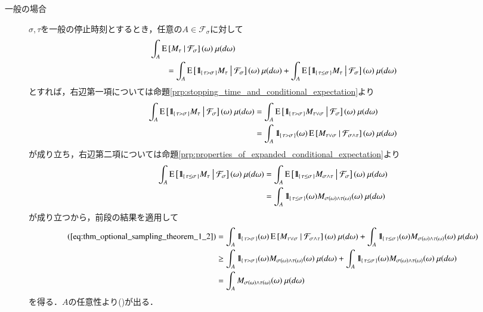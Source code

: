 \begin{prf}
\begin{description}
			\item[一般の場合]
				$\sigma,\tau$を一般の停止時刻とするとき，任意の$A \in \mathcal{F}_\sigma$に対して
				\begin{align}
					&\int_A \operatorname{E} \left[ M_\tau \ \middle|\ \mathcal{F}_\sigma \right](\omega)\ \mu(d\omega) \\
					&\qquad = \int_A \operatorname{E} \left[ \mbox{1}\hspace{-0.25em}\mbox{l}_{\{\, \tau > \sigma \, \}} M_\tau \ \middle|\ \mathcal{F}_\sigma \right](\omega)\ \mu(d\omega)
						+ \int_A \operatorname{E} \left[ \mbox{1}\hspace{-0.25em}\mbox{l}_{\{\, \tau \leq \sigma \, \}} M_\tau \ \middle|\ \mathcal{F}_\sigma \right](\omega)\ \mu(d\omega)
					\label{eq:thm_optional_sampling_theorem_1_2}
				\end{align}
				とすれば，右辺第一項については命題\ref{prp:stopping_time_and_conditional_expectation}より
				\begin{align}
					\int_A \operatorname{E} \left[ \mbox{1}\hspace{-0.25em}\mbox{l}_{\{\, \tau > \sigma \, \}} M_\tau \ \middle|\ \mathcal{F}_\sigma \right](\omega)\ \mu(d\omega)
					&= \int_A \operatorname{E} \left[ \mbox{1}\hspace{-0.25em}\mbox{l}_{\{\, \tau > \sigma \, \}} M_{\tau \vee \sigma} \ \middle|\ \mathcal{F}_\sigma \right](\omega)\ \mu(d\omega) \\
					&= \int_A \mbox{1}\hspace{-0.25em}\mbox{l}_{\{\, \tau > \sigma \, \}}(\omega) \operatorname{E} \left[ M_{\tau \vee \sigma} \ \middle|\ \mathcal{F}_{\sigma \wedge \tau} \right](\omega)\ \mu(d\omega)
				\end{align}
				が成り立ち，右辺第二項については命題\ref{prp:properties_of_expanded_conditional_expectation}より
				\begin{align}
					\int_A \operatorname{E} \left[ \mbox{1}\hspace{-0.25em}\mbox{l}_{\{\, \tau \leq \sigma \, \}} M_\tau \ \middle|\ \mathcal{F}_\sigma \right](\omega)\ \mu(d\omega)
					&= \int_A \operatorname{E} \left[ \mbox{1}\hspace{-0.25em}\mbox{l}_{\{\, \tau \leq \sigma \, \}} M_{\sigma \wedge \tau} \ \middle|\ \mathcal{F}_\sigma \right](\omega)\ \mu(d\omega) \\
					&= \int_A \mbox{1}\hspace{-0.25em}\mbox{l}_{\{\, \tau \leq \sigma \, \}}(\omega) M_{\sigma(\omega) \wedge \tau(\omega)}(\omega)\ \mu(d\omega)
				\end{align}
				が成り立つから，前段の結果を適用して
				\begin{align}
					\mbox{(\refeq{eq:thm_optional_sampling_theorem_1_2})}
					&= \int_A \defunc_{\{\, \tau > \sigma \, \}}(\omega) \cexp{M_{\tau \vee \sigma}}{\mathcal{F}_{\sigma \wedge \tau}}(\omega)\ \mu(d\omega)
						+ \int_A \defunc_{\{\, \tau \leq \sigma \, \}}(\omega) M_{\sigma(\omega) \wedge \tau(\omega)}(\omega)\ \mu(d\omega) \\
					&\geq \int_A \defunc_{\{\, \tau > \sigma \, \}}(\omega) M_{\sigma(\omega) \wedge \tau(\omega)}(\omega)\ \mu(d\omega)
						+ \int_A \defunc_{\{\, \tau \leq \sigma \, \}}(\omega) M_{\sigma(\omega) \wedge \tau(\omega)}(\omega)\ \mu(d\omega) \\
					&= \int_A M_{\sigma(\omega) \wedge \tau(\omega)}(\omega)\ \mu(d\omega)
				\end{align}
				を得る．$A$の任意性より()が出る．
				\QED
		\end{description}
	\end{prf}


